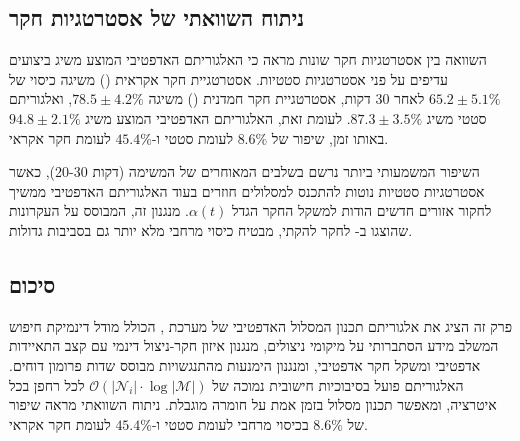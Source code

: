 \subsection{ניתוח השוואתי של אסטרטגיות חקר}
\label{sec:ch06_comparison}

השוואה בין אסטרטגיות חקר שונות מראה כי האלגוריתם האדפטיבי המוצע משיג ביצועים עדיפים על פני אסטרטגיות סטטיות. אסטרטגיית חקר אקראית () משיגה כיסוי של $65.2 \pm 5.1\%$ לאחר 30 דקות, אסטרטגיית חקר חמדנית () משיגה $78.5 \pm 4.2\%$, ואלגוריתם  סטטי משיג $87.3 \pm 3.5\%$. לעומת זאת, האלגוריתם האדפטיבי המוצע משיג $94.8 \pm 2.1\%$ באותו זמן, שיפור של $8.6\%$ לעומת  סטטי ו-$45.4\%$ לעומת חקר אקראי.

השיפור המשמעותי ביותר נרשם בשלבים המאוחרים של המשימה (דקות 20-30), כאשר אסטרטגיות סטטיות נוטות להתכנס למסלולים חוזרים בעוד האלגוריתם האדפטיבי ממשיך לחקור אזורים חדשים הודות למשקל החקר הגדל $\alpha(t)$. מנגנון זה, המבוסס על העקרונות שהוצגו ב-\cite{Coppola2020Swarming} לחקר להקתי, מבטיח כיסוי מרחבי מלא יותר גם בסביבות גדולות.

\subsection{סיכום}
\label{sec:ch06_summary}

פרק זה הציג את אלגוריתם תכנון המסלול האדפטיבי של מערכת , הכולל מודל דינמיקת חיפוש המשלב מידע הסתברותי על מיקומי ניצולים, מנגנון איזון חקר-ניצול דינמי עם קצב התאיידות אדפטיבי ומשקל חקר אדפטיבי, ומנגנון הימנעות מהתנגשויות מבוסס שדות פרומון דוחים. האלגוריתם פועל בסיבוכיות חישובית נמוכה של $\mathcal{O}(|\mathcal{N}_{i}| \cdot \log|\mathcal{M}|)$ לכל רחפן בכל איטרציה, ומאפשר תכנון מסלול בזמן אמת על חומרה מוגבלת. ניתוח השוואתי מראה שיפור של $8.6\%$ בכיסוי מרחבי לעומת  סטטי ו-$45.4\%$ לעומת חקר אקראי.

\cite{Dorigo2004ACO, Schroder2007ACO, Ranjbar2012Pheromone, Perez2018MultiUAV, Waharte2010SAR, Coppola2020Swarming}

